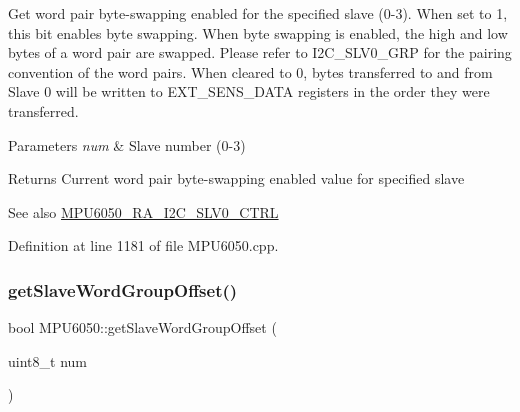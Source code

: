 Get word pair byte-\/swapping enabled for the specified slave (0-\/3). When set to 1, this bit enables byte swapping. When byte swapping is enabled, the high and low bytes of a word pair are swapped. Please refer to I2\+C\+\_\+\+S\+L\+V0\+\_\+\+G\+RP for the pairing convention of the word pairs. When cleared to 0, bytes transferred to and from Slave 0 will be written to E\+X\+T\+\_\+\+S\+E\+N\+S\+\_\+\+D\+A\+TA registers in the order they were transferred.


\begin{DoxyParams}{Parameters}
{\em num} & Slave number (0-\/3) \\
\hline
\end{DoxyParams}
\begin{DoxyReturn}{Returns}
Current word pair byte-\/swapping enabled value for specified slave 
\end{DoxyReturn}
\begin{DoxySeeAlso}{See also}
\mbox{\hyperlink{MPU6050_8h_a70ce4d71982a1e3fb2be9b71f40da786}{M\+P\+U6050\+\_\+\+R\+A\+\_\+\+I2\+C\+\_\+\+S\+L\+V0\+\_\+\+C\+T\+RL}} 
\end{DoxySeeAlso}


Definition at line 1181 of file M\+P\+U6050.\+cpp.


\begin{DoxyCode}{0}

\end{DoxyCode}
\mbox{\label{classMPU6050_a32ce8023bb80afc5d55811de70c7214f}} 
\subsubsection{\texorpdfstring{getSlaveWordGroupOffset()}{getSlaveWordGroupOffset()}}
{\footnotesize\ttfamily bool M\+P\+U6050\+::get\+Slave\+Word\+Group\+Offset (\begin{DoxyParamCaption}\item[{uint8\+\_\+t}]{num }\end{DoxyParamCaption})}

